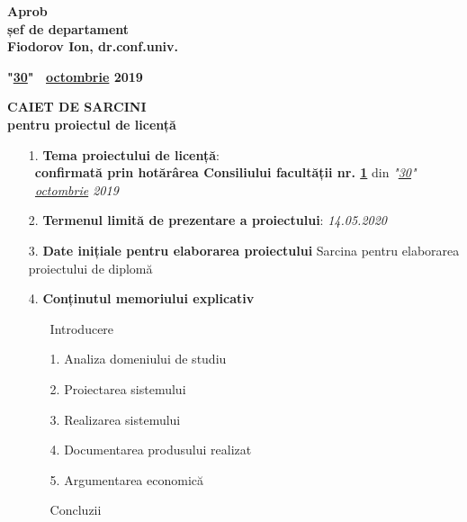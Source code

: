 \begin{titlepage}

    \newcommand{\HRule}{\rule{\linewidth}{0.5mm}}
    
    \UniversityHeader
    \center
    
    \vspace{2cm}
    \textbf{
        \hfill Aprob\\
        \hfill șef de departament\\
        \hfill Fiodorov Ion, dr.conf.univ.\\
    }
    
    \vspace{0.4cm}
    \hfill \textbf{"\underline{30}" \ \underline{octombrie} 2019}
    \vspace{2cm}

    
    
    \begin{center}
    \large \textbf{CAIET DE SARCINI} \\
    \vspace{0.2cm}
    \large \textbf{pentru proiectul de licență} \\
    \vspace{0.2cm}
    \large \MyName
    
    \end{center}
    
    \begin{enumerate}
    \item[1.]  \textbf{Tema proiectului de licență}: \ThesisTitle \\\ \textbf{confirmată prin hotărârea Consiliului facultății nr. \underline{1}} din \textit{"\underline{30}" \ \underline{octombrie} 2019}
    
    \item[2.]  \textbf{Termenul limită de prezentare a proiectului}: \textit{14.05.2020}
    
    \item[3.]  \textbf{Date inițiale pentru elaborarea proiectului} Sarcina pentru elaborarea proiectului de diplomă
    
    \item[4.]  \textbf{Conținutul memoriului explicativ}
    
    \begin{enumerate}
        \item[] Introducere
        \item[1.]Analiza domeniului de studiu
        \item[2.]Proiectarea sistemului
        \item[3.]Realizarea sistemului
        \item[4.]Documentarea produsului realizat
        \item[5.]Argumentarea economică
        \item[] Concluzii
    \end{enumerate}


\end{enumerate}
\end{titlepage}
